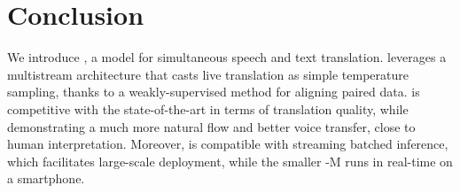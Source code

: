 \section{Conclusion}
\label{sec:conclusion}
We introduce \ours, a model for simultaneous speech and text translation. \ours leverages a multistream architecture that casts live translation as simple temperature sampling, thanks to a weakly-supervised method for aligning paired data. \ours is competitive with the state-of-the-art in terms of translation quality, while demonstrating a much more natural flow and better voice transfer, close to human interpretation. Moreover, \ours is compatible with streaming batched inference, which facilitates large-scale deployment, while the smaller \ours-M runs in real-time on a smartphone.
